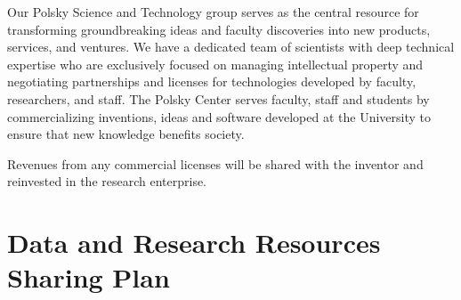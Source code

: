 \documentclass[onecolumn, compsoc,12pt]{IEEEtran}
\begin{document}
Our Polsky Science and Technology group serves as the central resource for transforming groundbreaking ideas and faculty discoveries into new products, services, and ventures. We have a dedicated team of scientists with deep technical expertise who are exclusively focused on managing intellectual property and negotiating partnerships and licenses for technologies developed by faculty, researchers, and staff. The Polsky Center serves faculty, staff and students by commercializing inventions, ideas and software developed at the University to ensure that new knowledge benefits society. 

Revenues from any commercial licenses will be shared with the inventor and reinvested in the research enterprise.



\clearpage

\section*{Data and Research Resources Sharing Plan}

\clearpage









\clearpage

%
%


\end{document}
